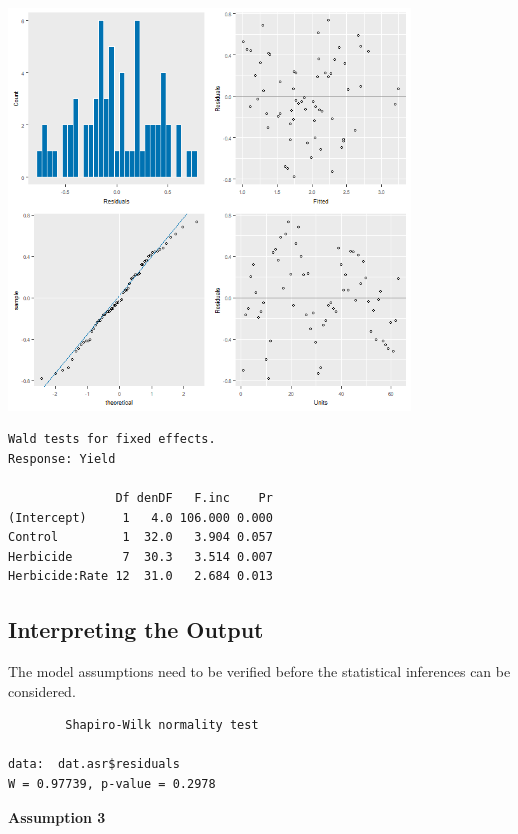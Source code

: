\documentclass[a4paper, 10pt, fleqn, twosided]{memoir}
\begin{document}
\begin{tcolorbox}[title = Example 7 Output]
\includegraphics[width=0.8\textwidth, frame]{Example7Resplot.png}
\begin{verbatim}
Wald tests for fixed effects.
Response: Yield

               Df denDF   F.inc    Pr
(Intercept)     1   4.0 106.000 0.000
Control         1  32.0   3.904 0.057
Herbicide       7  30.3   3.514 0.007
Herbicide:Rate 12  31.0   2.684 0.013
\end{verbatim}
\end{tcolorbox}


\subsection{Interpreting the Output}

The model assumptions need to be verified before the statistical inferences can be considered.

\begin{tcolorbox}[title = Example 7 Shapiro-Wilk normality test output]
\begin{verbatim}
        Shapiro-Wilk normality test

data:  dat.asr$residuals
W = 0.97739, p-value = 0.2978
\end{verbatim}
\end{tcolorbox}


\textbf{Assumption 3}
\end{document}
